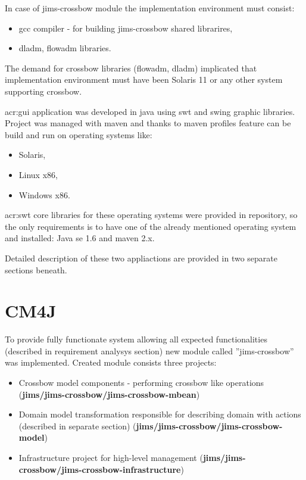 \documentclass[11pt]{book}
\begin{document}
      In case of jims-crossbow module the implementation environment must consist:

      \begin{itemize}
        \item gcc compiler - for building jims-crossbow shared librarires,
        \item dladm, flowadm libraries.
      \end{itemize}
	
      The demand for crossbow libraries (flowadm, dladm) implicated that implementation environment must have been
      Solaris 11 or any other system supporting crossbow.
    
      \gls{acr:gui} application was developed in java using swt and swing graphic libraries. Project was managed with maven and
      thanks to maven profiles feature can be build and run on operating systems like:

      \begin{itemize}
        \item Solaris,
        \item Linux x86,
        \item Windows x86.
      \end{itemize}

      \gls{acr:swt} core libraries for these operating systems were provided in repository, so the only requirements is to have
      one of the already mentioned operating system and installed: Java se 1.6 and maven 2.x.
	  
	  \medskip
	  
	  Detailed description of these two appliactions are provided in two separate sections beneath. 
	  
	  \section{CM4J}
		\label{sec:impl:module}
		
			To provide fully functionate system allowing all expected functionalities (described in requirement analysys section)
			new module called ''jims-crossbow'' was implemented. Created module consists three projects:
			\begin{itemize}
				\item{Crossbow model components - performing crossbow like operations (\textbf{jims/jims-crossbow/jims-crossbow-mbean})}
				\item{Domain model transformation responsible for describing domain with actions 
					(described in separate section) (\textbf{jims/jims-crossbow/jims-crossbow-model})}
				\item{Infrastructure project for high-level management (\textbf{jims/jims-crossbow/jims-crossbow-infrastructure})}
			\end{itemize}
		
\end{document}
